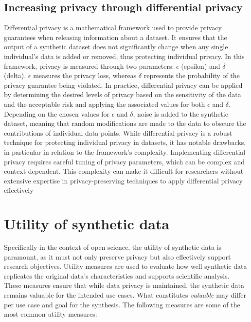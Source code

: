  \subsection{Increasing privacy through differential privacy}
 Differential privacy is a mathematical framework used to provide privacy guarantees when releasing information about a dataset. It ensures that the output of a synthetic dataset does not significantly change when any single individual's data is added or removed, thus protecting individual privacy. In this framework, privacy is measured through two parameters: $\epsilon$ (epsilon) and $\delta$ (delta). $\epsilon$ measures the privacy loss, whereas $\delta$ represents the probability of the privacy guarantee being violated. In practice, differential privacy can be applied by determining the desired levels of privacy based on the sensitivity of the data and the acceptable risk and applying the associated values for both $\epsilon$ and $\delta$. Depending on the chosen values for $\epsilon$ and $\delta$, noise is added to the synthetic dataset, meaning that random modifications are made to the data to obscure the contributions of individual data points. While differential privacy is a robust technique for protecting individual privacy in datasets, it has notable drawbacks, in particular in relation to the framework's complexity. Implementing differential privacy requires careful tuning of privacy parameters, which can be complex and context-dependent. This complexity can make it difficult for researchers without extensive expertise in privacy-preserving techniques to apply differential privacy effectively \cite{dwork2006differential}
 

\section{Utility of synthetic data}

Specifically in the context of open science, the utility of synthetic data is paramount, as it must not only preserve privacy but also effectively support research objectives. Utility measures are used to evaluate how well synthetic data replicates the original data's characteristics and supports scientific analysis. These measures ensure that while data privacy is maintained, the synthetic data remains valuable for the intended use cases. What constitutes \textit{valuable} may differ per use case and goal for the synthesis. The following measures are some of the most common utility measures:

